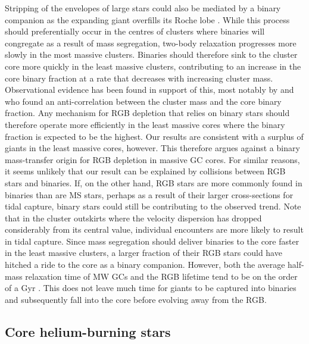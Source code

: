 Stripping of the envelopes of large stars could also be mediated by a
binary companion as the expanding giant overfills its Roche lobe
\citep{bailyn94}.  While this process should preferentially
occur in the centres of clusters where binaries will congregate as
a result of mass segregation, two-body relaxation progresses more
slowly in the most massive clusters.  Binaries should therefore sink 
to the cluster core more quickly in the least massive clusters,
contributing to an increase in the core binary fraction at a rate that
decreases with increasing cluster mass.  Observational evidence has
been found in support of this, most notably by \citet{sollima07} and
\citet{milone08} who found an anti-correlation between the cluster 
mass and the core binary fraction.  Any mechanism for RGB
depletion that relies on binary stars should therefore operate
more efficiently in the least massive cores where the binary
fraction is expected to be the highest.  Our results are consistent
with a surplus of giants in the least massive cores,
however.  This therefore argues against a binary mass-transfer origin
for RGB depletion in massive GC cores.  For similar reasons, it seems
unlikely that our result can be explained by collisions between RGB
stars and binaries.  If, on the other hand, 
RGB stars are more commonly found in binaries than are MS stars,
perhaps as a result of their larger cross-sections for tidal capture, 
binary stars could still be contributing to the observed trend.  Note
that in the cluster outskirts where the velocity dispersion has
dropped considerably from its central value, individual encounters are
more likely to result in tidal capture.  Since mass segregation should deliver
binaries to the core faster in the least massive clusters, a
larger fraction of their RGB stars could have hitched
a ride to the core as a binary companion.   However, both 
the average half-mass relaxation time of MW GCs and the RGB lifetime
tend to be on the order of a Gyr 
\citep{harris96, iben91}.  This does not leave much time for giants to be
captured into binaries and subsequently fall into the core before
evolving away from the RGB.

\subsection{Core helium-burning stars}

